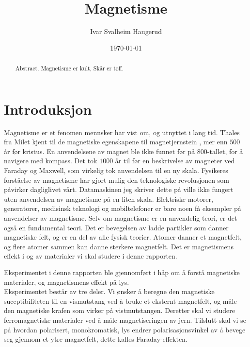 \documentclass[%
 reprint,
 amsmath,amssymb,
 aps,
]{revtex4-1}
\begin{document}

\title{Magnetisme}%

\author{Ivar Svalheim Haugerud}

%

\date{\today}%

\begin{abstract}
Abstract. Magnetisme er kult, Skår er tøff.
\end{abstract}

\maketitle


\section{\label{sec:level1}Introduksjon}
Magnetisme er et fenomen mennsker har vist om, og utnyttet i lang tid. Thales fra Milet kjent til de magnetiske egenskapene til magnetjernstein \cite{SNL}, mer enn $500$ år før kristus. En anvendelsene av magnet ble ikke funnet før på $800$-tallet, for å navigere med kompass. Det tok  $1000$ år til før en beskrivelse av magneter ved Faraday og Maxwell, som virkelig tok anvendelsen til en ny skala. Fysikeres forståelse av magnetisme har gjort mulig den teknologiske revolusjonen som påvirker dagliglivet vårt. Datamaskinen jeg skriver dette på ville ikke fungert uten anvendelsen av magnetisme på en liten skala. Elektriske motorer, generatorer, medisinsk teknologi og mobiltelefoner er bare noen få eksempler på anvendelser av magnetisme. Selv om magnetisme er en anvendelig teori, er det også en fundamental teori. Det er bevegelsen av ladde partikler som danner magnetiske felt, og er en del av alle fysisk teorier. Atomer danner et magnetfelt, og flere atomer sammen kan danne sterkere magnetfelt. Det er magnetismens effekt i og av materialer vi skal studere i denne rapporten.\par
Eksperimentet i denne rapporten ble gjennomført i håp om å forstå magnetiske materialer, og magnetismens effekt på lys.\\
Eksperimentet består av tre deler. Vi ønsker å beregne den magnetiske suceptibiliteten til en vismutstang ved å bruke et eksternt magnetfelt, og måle den magnetiske krafen som virker på vistmutstangen. Deretter skal vi studere ferromagnetiske materialer ved å måle magnetiseringen av jern. Tilslutt skal vi se på hvordan polarisert, monokromatisk, lys endrer polarisasjonsvinkel av å bevege seg gjennom et ytre magnetfelt, dette kalles Faraday-effekten.
\end{document}
